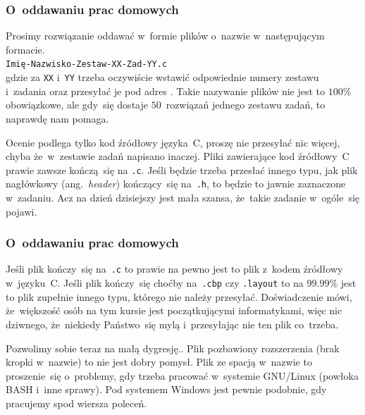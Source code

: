\documentclass[10pt,t]{beamer}
\begin{document}
\begin{frame}
  \frametitle{O~oddawaniu prac domowych}




  Prosimy rozwiązanie oddawać w~formie plików o~nazwie w~następującym
  formacie. \\
  \texttt{Imię-Nazwisko-Zestaw-XX-Zad-YY.c} \\
  gdzie za \texttt{XX} i~\texttt{YY} trzeba oczywiście wstawić odpowiednie
  numery zestawu i~zadania oraz przesyłać je pod adres \email. Takie
  nazywanie plików nie jest to $100 \%$ obowiązkowe, ale gdy~się dostaje
  $50$~rozwiązań jednego zestawu zadań, to naprawdę nam pomaga.

  Ocenie podlega tylko kod źródłowy języka~C, proszę nie przesyłać nic
  więcej, chyba że~w~zestawie zadań napisano inaczej. Pliki zawierające
  kod źródłowy~C prawie zawsze kończą~się na \texttt{.c}. Jeśli będzie
  trzeba przesłać innego typu, jak plik nagłówkowy (ang.~\textit{header})
  kończący~się na~\texttt{.h}, to będzie to jawnie zaznaczone w~zadaniu.
  Acz na dzień dzisiejszy jest mała szansa, że~takie zadanie w~ogóle~się
  pojawi.

\end{frame}





\begin{frame}
  \frametitle{O~oddawaniu prac domowych}


  Jeśli plik kończy~się na~\texttt{.c} to prawie na pewno jest to plik
  z~kodem źródłowy w~języku~C. Jeśli plik kończy~się choćby
  na~\texttt{.cbp} czy \texttt{.layout} to na $99.99 \%$ jest to plik
  zupełnie innego typu, którego nie należy przesyłać. Doświadczenie mówi,
  że~większość osób na tym kursie jest początkującymi informatykami, więc
  nic dziwnego, że~niekiedy Państwo~się mylą i~przesyłając nie ten plik
  co~trzeba.

  Pozwolimy sobie teraz na małą dygresję.. Plik pozbawiony rozszerzenia
  (brak kropki w~nazwie) to nie jest dobry pomysł. Plik ze spacją w~nazwie
  to proszenie~się o~problemy, gdy trzeba pracować w~systemie GNU/Linux
  (powłoka BASH i~inne sprawy). Pod systemem Windows jest pewnie podobnie,
  gdy pracujemy spod wiersza poleceń.

\end{frame}
\end{document}
